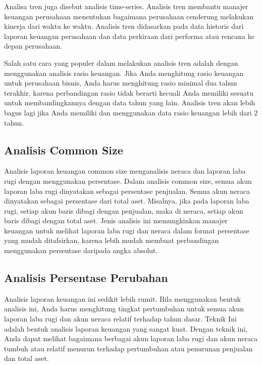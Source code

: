 \documentclass[
]{book}
\begin{document}
Analisa tren juga disebut analisis time-series. Analisis tren membantu manajer keuangan perusahaan menentukan bagaimana perusahaan cenderung melakukan kinerja dari waktu ke waktu. Analisis tren didasarkan pada data historis dari laporan keuangan perusahaan dan data perkiraan dari performa atau rencana ke depan perusahaan.

Salah satu cara yang populer dalam melakukan analisis tren adalah dengan menggunakan analisis rasio keuangan. Jika Anda menghitung rasio keuangan untuk perusahaan bisnis, Anda harus menghitung rasio minimal dua tahun terakhir, karena perbandingan rasio tidak berarti kecuali Anda memiliki sesuatu untuk membandingkannya dengan data tahun yang lain. Analisis tren akan lebih bagus lagi jika Anda memiliki dan menggunakan data rasio keuangan lebih dari 2 tahun.

\hypertarget{analisis-common-size}{%
\subsection{Analisis Common Size}\label{analisis-common-size}}

Analisis laporan keuangan common size menganalisis neraca dan laporan laba rugi dengan menggunakan persentase. Dalam analisis common size, semua akun laporan laba rugi dinyatakan sebagai persentase penjualan. Semua akun neraca dinyatakan sebagai persentase dari total aset. Misalnya, jika pada laporan laba rugi, setiap akun baris dibagi dengan penjualan, maka di neraca, setiap akun baris dibagi dengan total aset. Jenis analisis ini memungkinkan manajer keuangan untuk melihat laporan laba rugi dan neraca dalam format persentase yang mudah ditafsirkan, karena lebih mudah membuat perbandingan menggunakan persentase daripada angka absolut.

\hypertarget{analisis-persentase-perubahan}{%
\subsection{Analisis Persentase Perubahan}\label{analisis-persentase-perubahan}}

Analisis laporan keuangan ini sedikit lebih rumit. Bila menggunakan bentuk analisis ini, Anda harus menghitung tingkat pertumbuhan untuk semua akun laporan laba rugi dan akun neraca relatif terhadap tahun dasar. Teknik Ini adalah bentuk analisis laporan keuangan yang sangat kuat. Dengan teknik ini, Anda dapat melihat bagaimana berbagai akun laporan laba rugi dan akun neraca tumbuh atau relatif menurun terhadap pertumbuhan atau penurunan penjualan dan total aset.
\end{document}
